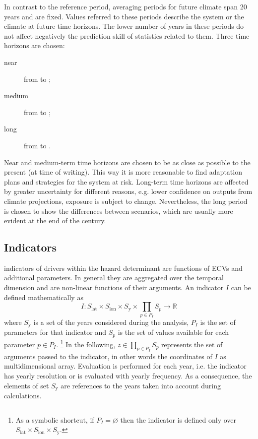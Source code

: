 In contrast to the reference period, averaging periods for future climate span 20 years and are fixed. Values referred to these periods describe the system or the climate at future time horizons. The lower number of years in these periods do not affect negatively the prediction skill of statistics related to them.\cite[17]{2017WorldMeteorologicalOrganizationWMOWMOGuidelines}
Three time horizons are chosen:
\begin{description}
  \item[near] from  to ;
  \item[medium] from  to ;
  \item[long] from  to .
\end{description}
Near and medium-term time horizons are chosen to be as close as possible to the present (at time of writing). This way it is more reasonable to find adaptation plans and strategies for the system at risk.
Long-term time horizons are affected by greater uncertainty for different reasons, e.g. lower confidence on outputs from climate projections, exposure is subject to change. Nevertheless, the long period is chosen to show the differences between scenarios, which are usually more evident at the end of the century.



\subsection{Indicators}
\Glspl{indicator} of \glspl{driver} within the \gls{hazard} \gls{determinant} are functions of \glspl{ECV} and additional parameters. In general they are aggregated over the temporal dimension and are non-linear functions of their arguments.
An \gls{indicator} $I$ can be defined mathematically as
\begin{equation}
  \label{eq:math_indicator}
  I : S_\text{lat} \times S_\text{lon} \times S_\text{y} \times \prod_{p \in P_I} S_p \to \mathbb{R}
\end{equation}
where $S_\text{y}$ is a set of the years considered during the analysis, $P_I$ is the set of parameters for that indicator and $S_p$ is the set of values available for each parameter $p \in P_I$.%
\footnote{As a symbolic shortcut, if $P_I = \varnothing$ then the indicator is defined only over $S_\text{lat} \times S_\text{lon} \times S_\text{y}$.}
In the following, $\underline{z} \in \prod_{p \in P_I} S_p$ represents the set of arguments passed to the \gls{indicator}, in other words the coordinates of $I$ as multidimensional array.
Evaluation is performed for each year, i.e. the \gls{indicator} has yearly resolution or is evaluated with yearly frequency. As a consequence, the elements of set $S_\text{y}$ are references to the years taken into account during calculations.


